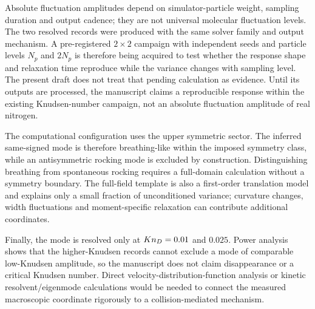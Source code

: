 Absolute fluctuation amplitudes depend on simulator-particle weight, sampling duration and output cadence; they are not universal molecular fluctuation levels. The two resolved records were produced with the same solver family and output mechanism. A pre-registered $2\times2$ campaign with independent seeds and particle levels $N_p$ and $2N_p$ is therefore being acquired to test whether the response shape and relaxation time reproduce while the variance changes with sampling level. The present draft does not treat that pending calculation as evidence. Until its outputs are processed, the manuscript claims a reproducible response within the existing Knudsen-number campaign, not an absolute fluctuation amplitude of real nitrogen.

The computational configuration uses the upper symmetric sector. The inferred same-signed mode is therefore breathing-like within the imposed symmetry class, while an antisymmetric rocking mode is excluded by construction. Distinguishing breathing from spontaneous rocking requires a full-domain calculation without a symmetry boundary. The full-field template is also a first-order translation model and explains only a small fraction of unconditioned variance; curvature changes, width fluctuations and moment-specific relaxation can contribute additional coordinates.

Finally, the mode is resolved only at $Kn_D=0.01$ and $0.025$. Power analysis shows that the higher-Knudsen records cannot exclude a mode of comparable low-Knudsen amplitude, so the manuscript does not claim disappearance or a critical Knudsen number. Direct velocity-distribution-function analysis or kinetic resolvent/eigenmode calculations would be needed to connect the measured macroscopic coordinate rigorously to a collision-mediated mechanism.
